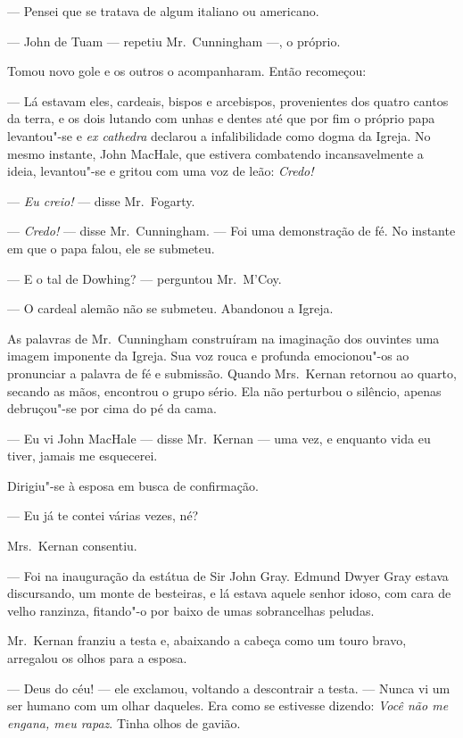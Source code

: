 --- Pensei que se tratava de algum italiano ou americano.

--- John de Tuam --- repetiu Mr.~Cunningham ---, o próprio.

Tomou novo gole e os outros o acompanharam.  Então recomeçou:

--- Lá estavam eles, cardeais, bispos e arcebispos, provenientes dos quatro
cantos da terra, e os dois lutando com unhas e dentes até que por fim o próprio
papa levantou"-se e \textit{ex cathedra} declarou a infalibilidade como dogma da
Igreja.  No mesmo instante, John MacHale, que estivera combatendo
incansavelmente a ideia, levantou"-se e gritou com uma voz de leão:
\textit{Credo!}

--- \textit{Eu creio!} --- disse Mr.~Fogarty.

--- \textit{Credo!} --- disse Mr.~Cunningham.  --- Foi uma demonstração de fé.
No instante em que o papa falou, ele se submeteu.

--- E o tal de Dowhing? --- perguntou Mr.~M’Coy.

--- O cardeal alemão não se submeteu.  Abandonou a Igreja.

As palavras de Mr.~Cunningham construíram na imaginação dos ouvintes uma imagem
imponente da Igreja.  Sua voz rouca e profunda emocionou"-os ao pronunciar a
palavra de fé e submissão.  Quando Mrs.~Kernan retornou ao quarto, secando as
mãos, encontrou o grupo sério.  Ela não perturbou o silêncio, apenas
debruçou"-se por cima do pé da cama.

--- Eu vi John MacHale --- disse Mr.~Kernan --- uma vez, e enquanto vida eu
tiver, jamais me esquecerei.

Dirigiu"-se à esposa em busca de confirmação.

--- Eu já te contei várias vezes, né?

Mrs.~Kernan consentiu.

--- Foi na inauguração da estátua de Sir John Gray.  Edmund Dwyer Gray estava
discursando, um monte de besteiras, e lá estava aquele senhor idoso, com cara
de velho ranzinza, fitando"-o por baixo de umas sobrancelhas peludas.

Mr.~Kernan franziu a testa e, abaixando a cabeça como um touro bravo, arregalou
os olhos para a esposa.

--- Deus do céu! --- ele exclamou, voltando a descontrair a testa.  --- Nunca
vi um ser humano com um olhar daqueles.  Era como se estivesse dizendo:
\textit{Você não me engana, meu rapaz}.  Tinha olhos de gavião.

